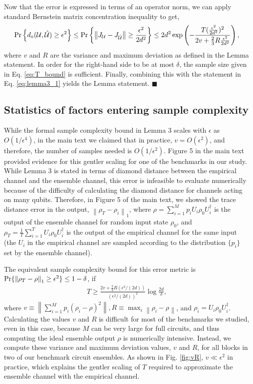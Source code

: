 \documentclass[fleqn,10pt]{wlscirep}
\newcommand{\dg}{^\dagger}
\newcommand{\pr}{{\rm Pr}}
\newcommand{\normo}[1]{\left\lVert #1 \right\rVert}
\newcommand{\normt}[1]{\left\lVert #1 \right\rVert_1}
\newcommand*{\QED}{\null\nobreak\hfill\ensuremath{\blacksquare}}%
\begin{document}
Now that the error is expressed in terms of an operator norm, we can apply standard Bernstein matrix concentration inequality \cite{tropp_2015} to get, 
\begin{align}
    \pr\left\{ d_\diamond(\mathcal{U}, \hat{\mathcal{U}}) \geq \epsilon^2 \right\} \leq \pr\left\{ \normo{J_\mathcal{U} - J_{\hat{\mathcal{U}}}} \geq \frac{\epsilon^2}{2d^2} \right\} \leq 2d^2 \exp\left(-\frac{T(\frac{\epsilon^2}{2d^2})^2}{2v + \frac{2}{3}R \frac{\epsilon^2}{2d^2}}\right),
\end{align} 
where $v$ and $R$ are the variance and maximum deviation as defined in the Lemma statement. In order for the right-hand side to be at most $\delta$, the sample size given in Eq. \eqref{eq:T_bound} is sufficient. Finally, combining this with the statement in Eq. \eqref{eq:lemma3_1} yields the Lemma statement. 
\QED

\subsection{Statistics of factors entering sample complexity}
While the formal sample complexity bound in Lemma 3 scales with $\epsilon$ as $O(1/\epsilon^4)$, in the main text we claimed that in practice, $v=O(\epsilon^2)$, and therefore, the number of samples needed is $O(1/\epsilon^2)$. Figure 5 in the main text provided evidence for this gentler scaling for one of the benchmarks in our study. While Lemma 3 is stated in terms of diamond distance between the empirical channel and the ensemble channel, this error is infeasible to evaluate numerically because of the difficulty of calculating the diamond distance for channels acting on many qubits. Therefore, in Figure 5 of the main text, we showed the trace distance error in the output, $\normt{\rho_{T} - \rho_i}$,
where $\rho = \sum_{i=1}^M p_i U_i \rho_{0} U_i\dg$ is the output of the ensemble channel for random input state $\rho_{0}$, and $\rho_{T} = \frac{1}{T}\sum_{i=1}^T U_i \rho_{0} U_i\dg$ is the output of the empirical channel for the same input (the $U_i$ in the empirical channel are sampled according to the distribution $\{p_i\}$ set by the ensemble channel). 

The equivalent sample complexity bound for this error metric is $\pr\{\normt{\rho_{T} - \rho} \geq \epsilon^2\} \leq 1-\delta$, if
\begin{align}
    T \geq \frac{2v + \frac{2}{3}R \left(\epsilon^2/(2d)\right) }{\left(\epsilon^2/(2d)\right)^2}\log \frac{2d}{\delta},
    \label{eq:T_bound_state} 
\end{align}
where $v \equiv \normo{\sum_{i=1}^M p_i (\rho_i - \rho)^2}, R \equiv \max_i \normo{\rho_i - \rho}$, and $\rho_i = U_i\rho_0 U_i\dg$. Calculating the values $v$ and $R$ is difficult for most of the benchmarks we studied, even in this case, because $M$ can be very large for full circuits, and thus computing the ideal ensemble output $\rho$ is numerically intensive. Instead, we compute these variance and maximum deviation values, $v$ and $R$, for all blocks in two of our benchmark circuit ensembles. As shown in Fig. \ref{fig:vR}, $v \ll \epsilon^2$ in practice, which explains the gentler scaling of $T$ required to approximate the ensemble channel with the empirical channel.
\end{document}
